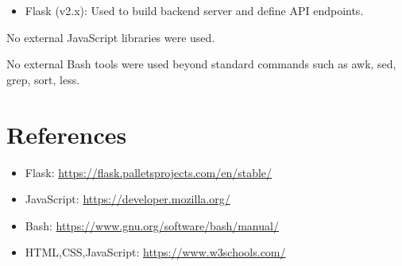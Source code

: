 \documentclass[12pt]{article}
\begin{document}
\begin{itemize}
    \item Flask (v2.x): Used to build backend server and define API endpoints.
\end{itemize}

No external JavaScript libraries were used. 

No external Bash tools were used beyond standard commands such as awk, sed, grep, sort, less.

\section{References}

\begin{itemize}
    \item Flask: \url{https://flask.palletsprojects.com/en/stable/}
    \item JavaScript: \url{https://developer.mozilla.org/}
    \item Bash: \url{https://www.gnu.org/software/bash/manual/}
    \item HTML,CSS,JavaScript: \url{https://www.w3schools.com/}
\end{itemize}
\end{document}
